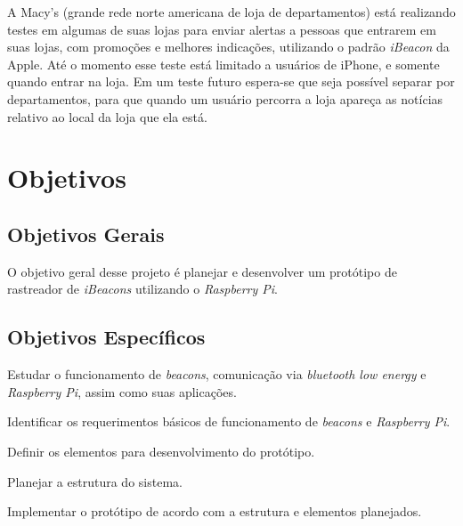 \documentclass[
		12pt,				%
		openright,			%
		oneside,			%
		a4paper,			%
		chapter=TITLE,		%
		english,			%
		brazil				%
	]{abntex2}
\begin{document}
A Macy's (grande rede norte americana de loja de departamentos) está realizando testes em algumas de suas lojas para enviar alertas a pessoas que entrarem em suas lojas, com promoções e melhores indicações, utilizando o padrão \textit{iBeacon} da Apple. Até o momento esse teste está limitado a usuários de iPhone, e somente quando entrar na loja. Em um teste futuro espera-se que seja possível separar por departamentos, para que quando um usuário percorra a loja apareça as notícias relativo ao local da loja que ela está. \cite{kastrenakes-macys-beacon}



\chapter{Objetivos}\label{cap:objetivos}

\section{Objetivos Gerais}

O objetivo geral desse projeto é planejar e desenvolver um protótipo de rastreador de \textit{iBeacons} utilizando o \textit{Raspberry Pi}.


\section{Objetivos Específicos}

\begin{alineas}
	\item Estudar o funcionamento de \textit{beacons}, comunicação via \textit{bluetooth low energy} e \textit{Raspberry Pi}, assim como suas aplicações.
	\item Identificar os requerimentos básicos de funcionamento de \textit{beacons} e \textit{Raspberry Pi}.
	\item Definir os elementos para desenvolvimento do protótipo.
	\item Planejar a estrutura do sistema.
	\item Implementar o protótipo de acordo com a estrutura e elementos planejados.
\end{alineas}
\end{document}
